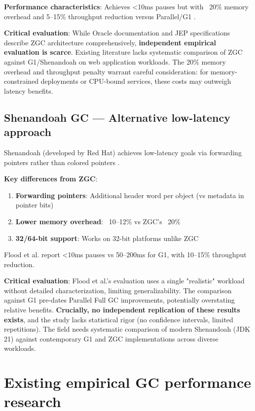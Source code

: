 \textbf{Performance characteristics}: Achieves <10ms pauses but with ~20\% memory overhead and 5--15\% throughput reduction versus Parallel/G1 \cite{oracle2023gc}.

\textbf{Critical evaluation}: While Oracle documentation \cite{oracle2023gc} and JEP specifications \cite{jep333} describe ZGC architecture comprehensively, \textbf{independent empirical evaluation is scarce}. Existing literature lacks systematic comparison of ZGC against G1/Shenandoah on web application workloads. The 20\% memory overhead and throughput penalty warrant careful consideration: for memory-constrained deployments or CPU-bound services, these costs may outweigh latency benefits.

\subsection{Shenandoah GC --- Alternative low-latency approach}
\label{subsec:shenandoah}

Shenandoah (developed by Red Hat) achieves low-latency goals via forwarding pointers rather than colored pointers \cite{flood2016shenandoah, jep189}.

\textbf{Key differences from ZGC}:
\begin{enumerate}
    \item \textbf{Forwarding pointers}: Additional header word per object (vs metadata in pointer bits)
    \item \textbf{Lower memory overhead}: ~10--12\% vs ZGC's ~20\%
    \item \textbf{32/64-bit support}: Works on 32-bit platforms unlike ZGC
\end{enumerate}

Flood et al. \cite{flood2016shenandoah} report <10ms pauses vs 50--200ms for G1, with 10--15\% throughput reduction.

\textbf{Critical evaluation}: Flood et al.'s evaluation \cite{flood2016shenandoah} uses a single "realistic" workload without detailed characterization, limiting generalizability. The comparison against G1 pre-dates Parallel Full GC improvements, potentially overstating relative benefits. \textbf{Crucially, no independent replication of these results exists}, and the study lacks statistical rigor (no confidence intervals, limited repetitions). The field needs systematic comparison of modern Shenandoah (JDK 21) against contemporary G1 and ZGC implementations across diverse workloads.

\section{Existing empirical GC performance research}
\label{sec:existing-research}

